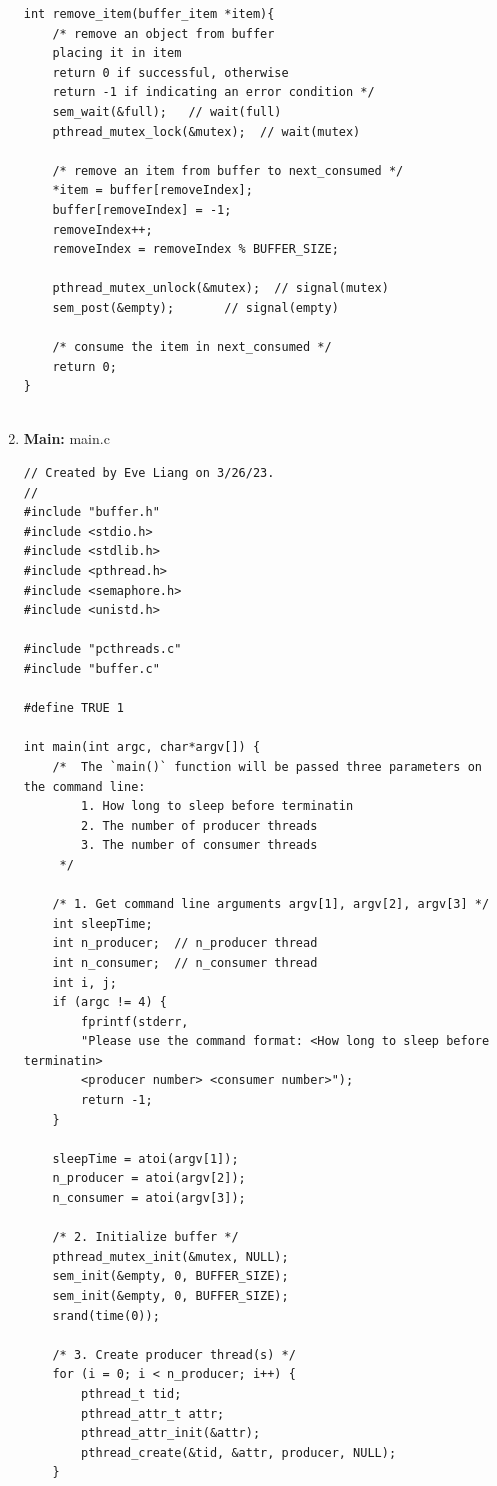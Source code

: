 \documentclass[12pt]{article}
\newenvironment{sol}[1][Solution]{\begin{trivlist}\item[\hskip\labelsep {\bfseries #1:}]}{\end{trivlist}}
\begin{document}
\begin{sol}
\begin{enumerate}
\begin{verbatim}
int remove_item(buffer_item *item){
    /* remove an object from buffer
    placing it in item
    return 0 if successful, otherwise
    return -1 if indicating an error condition */
    sem_wait(&full);   // wait(full)
    pthread_mutex_lock(&mutex);  // wait(mutex)

    /* remove an item from buffer to next_consumed */
    *item = buffer[removeIndex];
    buffer[removeIndex] = -1;
    removeIndex++;
    removeIndex = removeIndex % BUFFER_SIZE;

    pthread_mutex_unlock(&mutex);  // signal(mutex)
    sem_post(&empty);       // signal(empty)

    /* consume the item in next_consumed */
    return 0;
}
        
    \end{verbatim}

    \item[(c)] \textbf{Main: } main.c 
        \begin{verbatim}
// Created by Eve Liang on 3/26/23.
//
#include "buffer.h"
#include <stdio.h>
#include <stdlib.h>
#include <pthread.h>
#include <semaphore.h>
#include <unistd.h>

#include "pcthreads.c"
#include "buffer.c"

#define TRUE 1

int main(int argc, char*argv[]) {
    /*  The `main()` function will be passed three parameters on the command line:
        1. How long to sleep before terminatin
        2. The number of producer threads
        3. The number of consumer threads
     */

    /* 1. Get command line arguments argv[1], argv[2], argv[3] */
    int sleepTime;
    int n_producer;  // n_producer thread
    int n_consumer;  // n_consumer thread
    int i, j;
    if (argc != 4) {
        fprintf(stderr,
        "Please use the command format: <How long to sleep before terminatin>
        <producer number> <consumer number>");
        return -1;
    }

    sleepTime = atoi(argv[1]);
    n_producer = atoi(argv[2]);
    n_consumer = atoi(argv[3]);

    /* 2. Initialize buffer */
    pthread_mutex_init(&mutex, NULL);
    sem_init(&empty, 0, BUFFER_SIZE);
    sem_init(&empty, 0, BUFFER_SIZE);
    srand(time(0));

    /* 3. Create producer thread(s) */
    for (i = 0; i < n_producer; i++) {
        pthread_t tid;
        pthread_attr_t attr;
        pthread_attr_init(&attr);
        pthread_create(&tid, &attr, producer, NULL);
    }


\end{verbatim}
\end{enumerate}
\end{sol}
\end{document}
